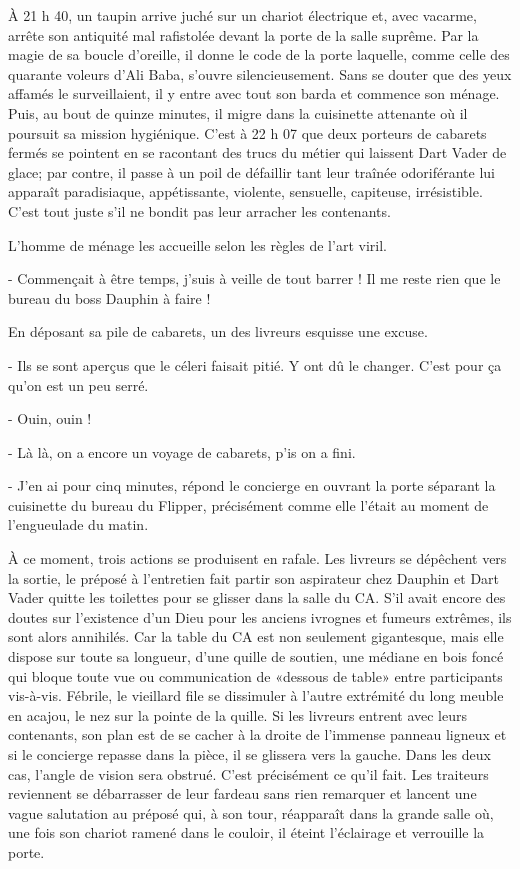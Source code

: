À 21 h 40, un taupin arrive juché sur un chariot électrique et, avec vacarme, arrête son antiquité mal rafistolée devant la porte de la salle suprême. Par la magie de sa boucle d’oreille, il donne le code de la porte laquelle, comme celle des quarante voleurs d’Ali Baba, s’ouvre silencieusement. Sans se douter que des yeux affamés le surveillaient, il y entre avec tout son barda et commence son ménage. Puis, au bout de quinze minutes, il migre dans la cuisinette attenante où il poursuit sa mission hygiénique. C’est à 22 h 07 que deux porteurs de cabarets fermés se pointent en se racontant des trucs du métier qui laissent Dart Vader de glace; par contre, il passe à un poil de défaillir tant leur traînée odoriférante lui apparaît paradisiaque, appétissante, violente, sensuelle, capiteuse, irrésistible. C’est tout juste s’il ne bondit pas leur arracher les contenants.

L’homme de ménage les accueille selon les règles de l’art viril.

- Commençait à être temps, j’suis à veille de tout barrer ! Il me reste rien que le bureau du boss Dauphin à faire !

En déposant sa pile de cabarets, un des livreurs esquisse une excuse.

- Ils se sont aperçus que le céleri faisait pitié. Y ont dû le changer. C’est pour ça qu’on est un peu serré.

- Ouin, ouin !

- Là là, on a encore un voyage de cabarets, p’is on a fini.

- J’en ai pour cinq minutes, répond le concierge en ouvrant la porte séparant la cuisinette du bureau du Flipper, précisément comme elle l’était au moment de l’engueulade du matin.

À ce moment, trois actions se produisent en rafale. Les livreurs se dépêchent vers la sortie, le préposé à l’entretien fait partir son aspirateur chez Dauphin et Dart Vader quitte les toilettes pour se glisser dans la salle du CA. S’il avait encore des doutes sur l’existence d’un Dieu pour les anciens ivrognes et fumeurs extrêmes, ils sont alors annihilés. Car la table du CA est non seulement gigantesque, mais elle dispose sur toute sa longueur, d’une quille de soutien, une médiane en bois foncé qui bloque toute vue ou communication de «dessous de table» entre participants vis-à-vis. Fébrile, le vieillard file se dissimuler à l’autre extrémité du long meuble en acajou, le nez sur la pointe de la quille. Si les livreurs entrent avec leurs contenants, son plan est de se cacher à la droite de l’immense panneau ligneux et si le concierge repasse dans la pièce, il se glissera vers la gauche. Dans les deux cas, l’angle de vision sera obstrué. C’est précisément ce qu’il fait. Les traiteurs reviennent se débarrasser de leur fardeau sans rien remarquer et lancent une vague salutation au préposé qui, à son tour, réapparaît dans la grande salle où, une fois son chariot ramené dans le couloir, il éteint l’éclairage et verrouille la porte.

